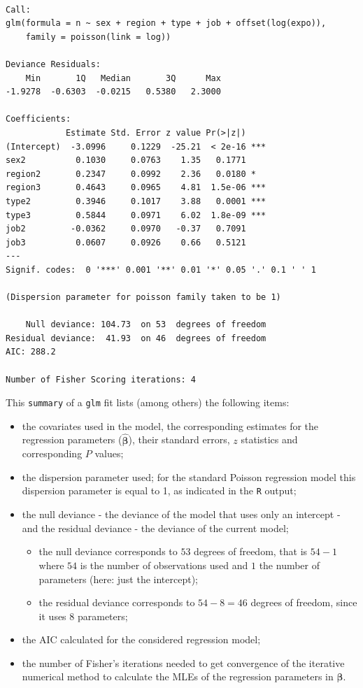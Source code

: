 \documentclass[
]{book}
\providecommand{\tightlist}{%
  \setlength{\itemsep}{0pt}\setlength{\parskip}{0pt}}
\begin{document}
\begin{verbatim}

Call:
glm(formula = n ~ sex + region + type + job + offset(log(expo)), 
    family = poisson(link = log))

Deviance Residuals: 
    Min       1Q   Median       3Q      Max  
-1.9278  -0.6303  -0.0215   0.5380   2.3000  

Coefficients:
            Estimate Std. Error z value Pr(>|z|)    
(Intercept)  -3.0996     0.1229  -25.21  < 2e-16 ***
sex2          0.1030     0.0763    1.35   0.1771    
region2       0.2347     0.0992    2.36   0.0180 *  
region3       0.4643     0.0965    4.81  1.5e-06 ***
type2         0.3946     0.1017    3.88   0.0001 ***
type3         0.5844     0.0971    6.02  1.8e-09 ***
job2         -0.0362     0.0970   -0.37   0.7091    
job3          0.0607     0.0926    0.66   0.5121    
---
Signif. codes:  0 '***' 0.001 '**' 0.01 '*' 0.05 '.' 0.1 ' ' 1

(Dispersion parameter for poisson family taken to be 1)

    Null deviance: 104.73  on 53  degrees of freedom
Residual deviance:  41.93  on 46  degrees of freedom
AIC: 288.2

Number of Fisher Scoring iterations: 4
\end{verbatim}

This \texttt{summary} of a \texttt{glm} fit lists (among others) the following items:

\begin{itemize}
\tightlist
\item
  the covariates used in the model, the corresponding estimates for the regression parameters (\(\boldsymbol{\hat{\beta}}\)), their standard errors, \(z\) statistics and corresponding \(P\) values;
\item
  the dispersion parameter used; for the standard Poisson regression model this dispersion parameter is equal to 1, as indicated in the \texttt{R} output;
\item
  the null deviance - the deviance of the model that uses only an intercept - and the residual deviance - the deviance of the current model;

  \begin{itemize}
  \tightlist
  \item
    the null deviance corresponds to \(53\) degrees of freedom, that is \(54-1\) where \(54\) is the number of observations used and \(1\) the number of parameters (here: just the intercept);
  \item
    the residual deviance corresponds to \(54-8=46\) degrees of freedom, since it uses \(8\) parameters;
  \end{itemize}
\item
  the AIC calculated for the considered regression model;
\item
  the number of Fisher's iterations needed to get convergence of the iterative numerical method to calculate the MLEs of the regression parameters in \(\boldsymbol{\beta}\).
\end{itemize}
\end{document}
